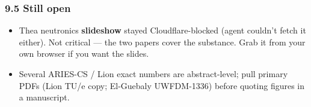 \documentclass[
]{article}
\providecommand{\tightlist}{%
  \setlength{\itemsep}{0pt}\setlength{\parskip}{0pt}}
\begin{document}
\subsubsection{9.5 Still open}\label{still-open}

\begin{itemize}
\tightlist
\item
  Thea neutronics \textbf{slideshow} stayed Cloudflare-blocked (agent
  couldn't fetch it either). Not critical --- the two papers cover the
  substance. Grab it from your own browser if you want the slides.
\item
  Several ARIES-CS / Lion exact numbers are abstract-level; pull primary
  PDFs (Lion TU/e copy; El-Guebaly UWFDM-1336) before quoting figures in
  a manuscript.
\end{itemize}
\end{document}
